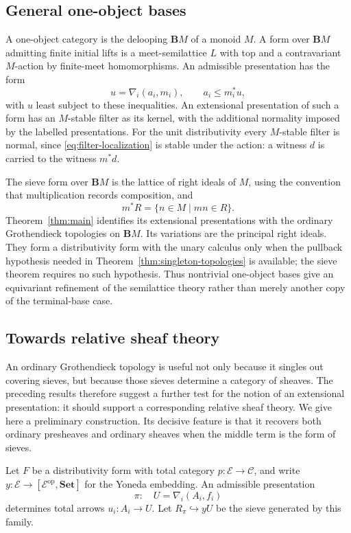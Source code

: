 \documentclass[12pt,oneside,reqno]{amsart}
\theoremstyle{definition}
\theoremstyle{remark}
\newcommand{\C}{\mathcal C}
\begin{document}
\subsection{General one-object bases}

A one-object category is the delooping \(\mathbf BM\) of a monoid
\(M\).  A form over \(\mathbf BM\) admitting finite initial lifts is a
meet-semilattice \(L\) with top and a contravariant \(M\)-action by
finite-meet homomorphisms.  An admissible presentation has the form
\[
                         u=\nabla_i(a_i,m_i),
 \qquad a_i\leqslant m_i^*u,
\]
with \(u\) least subject to these inequalities.  An extensional
presentation of such a form has an \(M\)-stable filter as its kernel,
with the additional
normality imposed by the labelled presentations.  For the unit
distributivity every \(M\)-stable filter is normal, since
\eqref{eq:filter-localization} is stable under the action: a witness
\(d\) is carried to the witness \(m^*d\).

The sieve form over \(\mathbf BM\) is the lattice of right ideals of
\(M\), using the convention that multiplication records composition,
and
\[
                         m^*R=\{n\in M\mid mn\in R\}.
\]
Theorem~\ref{thm:main} identifies its extensional presentations with the
ordinary Grothendieck topologies on \(\mathbf BM\).  Its variations are the
principal right ideals.  They form a distributivity form with the unary
calculus only when the pullback hypothesis needed in
Theorem~\ref{thm:singleton-topologies} is available; the sieve theorem
requires no such hypothesis.  Thus nontrivial one-object bases give an
equivariant refinement of the semilattice theory rather than merely
another copy of the terminal-base case.

\subsection{Towards relative sheaf theory}

An ordinary Grothendieck topology is useful not only because it singles
out covering sieves, but because those sieves determine a category of
sheaves.  The preceding results therefore suggest a further test for the
notion of an extensional presentation: it should support a corresponding
relative sheaf theory.  We give here a preliminary construction.  Its
decisive feature is that it recovers both ordinary presheaves and ordinary
sheaves when the middle term is the form of sieves.

Let \(F\) be a distributivity form with total category
\(p:\mathcal E\to\C\), and write
\(y:\mathcal E\to[\mathcal E^{\mathrm{op}},\mathbf{Set}]\) for the
Yoneda embedding.  An admissible presentation
\[
                         \pi:\quad
                         U=\nabla_i(A_i,f_i)
\]
determines total arrows \(u_i:A_i\to U\).  Let
\(R_\pi\hookrightarrow yU\) be the sieve generated by this family.
\end{document}
